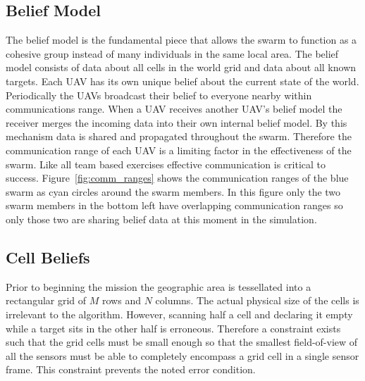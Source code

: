\newpage
\clearpage

\begin{multicols*}{2}


\section{Belief Model}
\label{sec:uavBelief}
The belief model is the fundamental piece that allows the swarm to function as a cohesive group instead of many individuals in the same local area.  The belief model consists of data about all cells in the world grid and data about all known targets.  Each UAV has its own unique belief about the current state of the world.  Periodically the UAVs broadcast their belief to everyone nearby within communications range.  When a UAV receives another UAV's belief model the receiver merges the incoming data into their own internal belief model.  By this mechanism data is shared and propagated throughout the swarm.  Therefore the communication range of each UAV is a limiting factor in the effectiveness of the swarm.  Like all team based exercises effective communication is critical to success.  Figure~\ref{fig:comm_ranges} shows the communication ranges of the blue swarm as cyan circles around the swarm members.  In this figure only the two swarm members in the bottom left have overlapping communication ranges so only those two are sharing belief data at this moment in the simulation.



\subsection{Cell Beliefs}
Prior to beginning the mission the geographic area is tessellated into a rectangular grid of $M$ rows and $N$ columns.  The actual physical size of the cells is irrelevant to the algorithm.  However, scanning half a cell and declaring it empty while a target sits in the other half is erroneous.  Therefore a constraint exists such that the grid cells must be small enough so that the smallest field-of-view of all the sensors must be able to completely encompass a grid cell in a single sensor frame.  This constraint prevents the noted error condition.


\end{multicols*}
